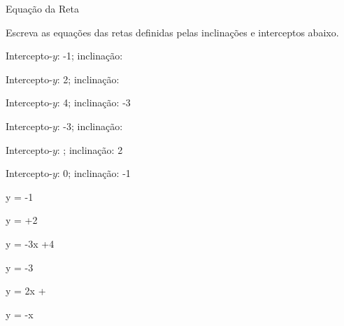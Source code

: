 \begin{exercicios}{Equação da Reta}
    \begin{exercicio}
        Escreva as equações das retas definidas pelas inclinações e interceptos abaixo.
        \begin{alphalist}
            \item Intercepto-$y$:  -1;          inclinação: 
            \item Intercepto-$y$:   2;          inclinação: 
            \item Intercepto-$y$:   4;          inclinação: -3
            \item Intercepto-$y$:  -3;          inclinação: 
            \item Intercepto-$y$: ; inclinação:  2
            \item Intercepto-$y$:   0;          inclinação: -1
        \end{alphalist}
        \begin{answers}
            \begin{mathlist}[2]
                \item y =     -1
                \item y =     +2
                \item y = -3x      +4
                \item y =     -3
                \item y =  2x    +
                \item y = -x                        
            \end{mathlist}
        \end{answers}
    \end{exercicio}
    

\end{exercicios}
